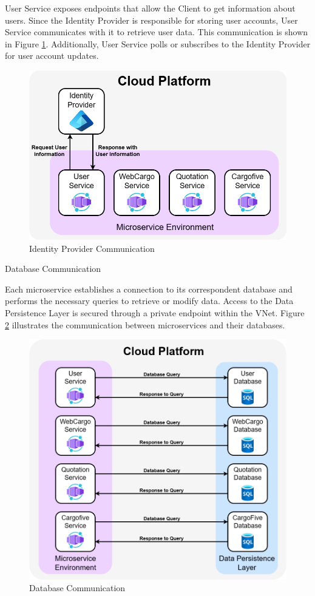 \documentclass[12pt, reqno]{amsbook}
\makeatletter
\def\subsection{\@startsection{subsection}{2}%
      \z@{.5\linespacing\@plus.7\linespacing}{.25\linespacing}%
      {\normalfont\bfseries\flushleft}}
\theoremstyle{definition}
\theoremstyle{definition}
\numberwithin{section}{chapter}
\numberwithin{table}{chapter}
\numberwithin{figure}{chapter}
\makeatother
\begin{document}
User Service exposes endpoints that allow the Client to get information about users. Since the Identity Provider is responsible for storing user accounts, User Service communicates with it to retrieve user data. This communication is shown in Figure \ref{Figure:IdentityProviderCommunication}. Additionally, User Service polls or subscribes to the Identity Provider for user account updates.

\begin{figure}[H]
  \centering
  \includegraphics[width=0.8\linewidth]{images/IdentityProviderCommunication.png}
  \caption{\label{Figure:IdentityProviderCommunication}Identity Provider Communication}
\end{figure}

\subsection{Database Communication}

Each microservice establishes a connection to its correspondent database and performs the necessary queries to retrieve or modify data. Access to the Data Persistence Layer is secured through a private endpoint within the VNet. Figure \ref{Figure:DatabaseCommunication} illustrates the communication between microservices and their databases.

\begin{figure}[H]
  \centering
  \includegraphics[width=0.85\linewidth]{images/DatabaseCommunication.png}
  \caption{\label{Figure:DatabaseCommunication}Database Communication}
\end{figure}
\end{document}
